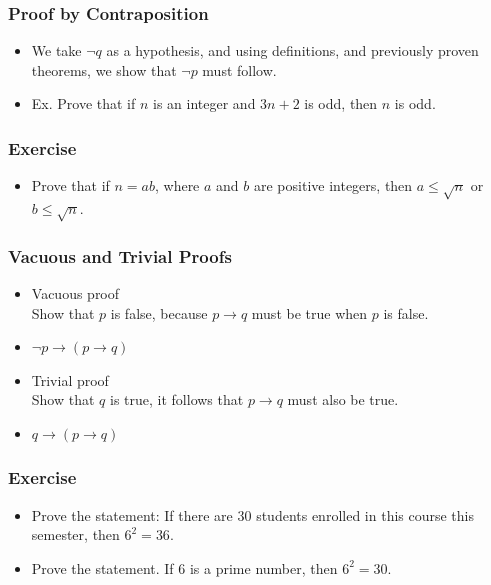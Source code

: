 \documentclass{beamer}
\begin{document}
\begin{frame}
\frametitle{Proof by Contraposition}
\begin{itemize} 
\Large
\item <1-> We take $\neg q$ as a hypothesis, and using definitions, and previously proven theorems,  we show that $\neg p$ must follow.
\item <2-> Ex. Prove that if $n$ is an integer and $3n + 2$ is odd, then $n$ is odd.
\end{itemize}
\end{frame}  



\begin{frame}
\frametitle{\HandRight Exercise}
\begin{itemize} 
\Large
\item <1-> Prove that if $n = ab$, where $a$ and $b$ are positive integers, then $a \le \sqrt{n}$ or $b \le \sqrt{n}$.  
\end{itemize}
\end{frame}  




\begin{frame}
\frametitle{Vacuous and Trivial Proofs}
\begin{itemize} 
\Large
\item <1-> Vacuous proof \\
Show that $p$ is false, because $p \to q$ must be true when $p$ is false.
\item <1->  $ \neg p \to \left( {p \to q} \right) $
\item <2-> Trivial proof \\
Show that $q$ is true, it follows that $p \to q$ must also be true.
\item <2-> $ q \to \left( {p \to q} \right) $
\end{itemize}
\end{frame}  



\begin{frame}
\frametitle{\HandRightUp Exercise}
\begin{itemize} 
\Large
\item <1-> Prove the statement: If there are $30$ students enrolled in this course this semester, then $6^2 = 36$.
\item <2-> Prove the statement. If $6$ is a prime number, then $6^2 = 30$.
\end{itemize}
\end{frame}  
\end{document}
